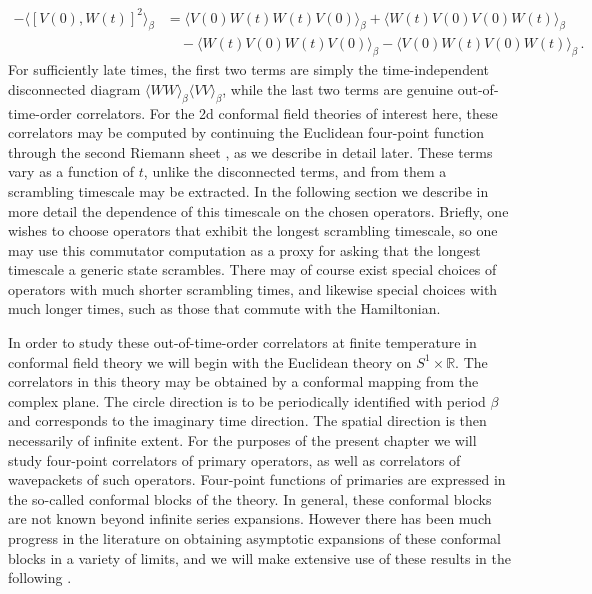 \documentclass{brownthesis}
\begin{document}
\begin{align}
-\langle[V(0),W(t)]^{2}\rangle_{\beta} & =\langle V(0)W(t)W(t)V(0)\rangle_{\beta}+\langle W(t)V(0)V(0)W(t)\rangle_{\beta}\nonumber \\
 & \quad-\langle W(t)V(0)W(t)V(0)\rangle_{\beta}-\langle V(0)W(t)V(0)W(t)\rangle_{\beta}\,.\label{eq:commutator}
\end{align}
For sufficiently late times, the first two terms are simply the time-independent
disconnected diagram $\langle WW\rangle_{\beta}\langle VV\rangle_{\beta}$,
while the last two terms are genuine out-of-time-order correlators.
For the 2d conformal field theories of interest here, these correlators
may be computed by continuing the Euclidean four-point function through
the second Riemann sheet \cite{PhysRevLett.115.131603}, as we describe
in detail later. These terms vary as a function of $t$, unlike the
disconnected terms, and from them a scrambling timescale may be extracted.
In the following section we describe in more detail the dependence
of this timescale on the chosen operators. Briefly, one wishes to
choose operators that exhibit the longest scrambling timescale, so
one may use this commutator computation as a proxy for asking that
the longest timescale a generic state scrambles. There may of course
exist special choices of operators with much shorter scrambling times,
and likewise special choices with much longer times, such as those
that commute with the Hamiltonian.

In order to study these out-of-time-order correlators at finite temperature
in conformal field theory we will begin with the Euclidean theory
on $S^{1}\times\mathbb{R}$. The correlators in this theory may be
obtained by a conformal mapping from the complex plane. The circle
direction is to be periodically identified with period $\beta$ and
corresponds to the imaginary time direction. The spatial direction
is then necessarily of infinite extent. For the purposes of the present
chapter we will study four-point correlators of primary operators, as
well as correlators of wavepackets of such operators. Four-point functions
of primaries are expressed in the so-called conformal blocks of the
theory. In general, these conformal blocks are not known beyond infinite
series expansions. However there has been much progress in the literature
on obtaining asymptotic expansions of these conformal blocks in a
variety of limits, and we will make extensive use of these results
in the following \cite{Fitzpatrick:2014vua}.
\end{document}
